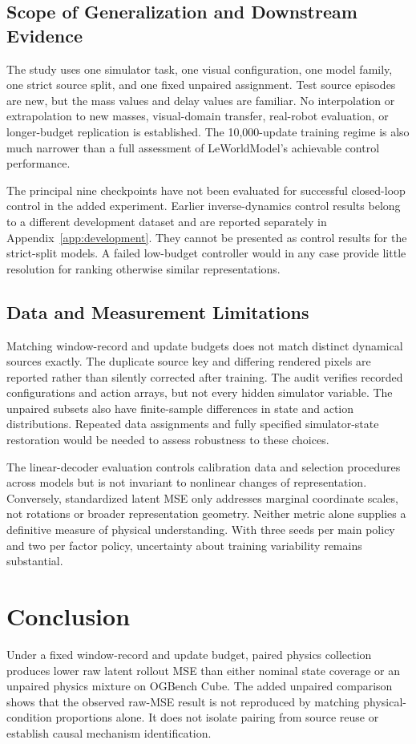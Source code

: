 \subsection{Scope of Generalization and Downstream Evidence}
The study uses one simulator task, one visual configuration, one model family, one strict source split, and one fixed unpaired assignment. Test source episodes are new, but the mass values and delay values are familiar. No interpolation or extrapolation to new masses, visual-domain transfer, real-robot evaluation, or longer-budget replication is established. The 10,000-update training regime is also much narrower than a full assessment of LeWorldModel's achievable control performance.

The principal nine checkpoints have not been evaluated for successful closed-loop control in the added experiment. Earlier inverse-dynamics control results belong to a different development dataset and are reported separately in Appendix~\ref{app:development}. They cannot be presented as control results for the strict-split models. A failed low-budget controller would in any case provide little resolution for ranking otherwise similar representations.

\subsection{Data and Measurement Limitations}
Matching window-record and update budgets does not match distinct dynamical sources exactly. The duplicate source key and differing rendered pixels are reported rather than silently corrected after training. The audit verifies recorded configurations and action arrays, but not every hidden simulator variable. The unpaired subsets also have finite-sample differences in state and action distributions. Repeated data assignments and fully specified simulator-state restoration would be needed to assess robustness to these choices.

The linear-decoder evaluation controls calibration data and selection procedures across models but is not invariant to nonlinear changes of representation. Conversely, standardized latent MSE only addresses marginal coordinate scales, not rotations or broader representation geometry. Neither metric alone supplies a definitive measure of physical understanding. With three seeds per main policy and two per factor policy, uncertainty about training variability remains substantial.

\section{Conclusion}
Under a fixed window-record and update budget, paired physics collection produces lower raw latent rollout MSE than either nominal state coverage or an unpaired physics mixture on OGBench Cube. The added unpaired comparison shows that the observed raw-MSE result is not reproduced by matching physical-condition proportions alone. It does not isolate pairing from source reuse or establish causal mechanism identification.

